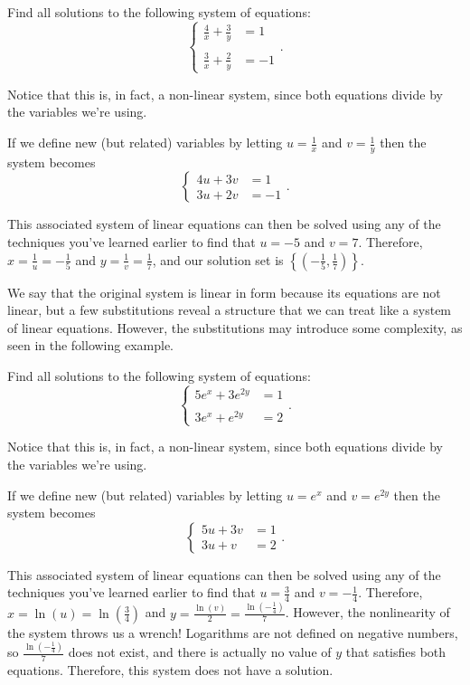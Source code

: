 \documentclass[nooutcomes]{ximera}
\begin{document}
\begin{example}
Find all solutions to the following system of equations:
$$
\begin{cases}
\frac{4}{x} + \frac{3}{y} & =  1 \\
& \\
\frac{3}{x} + \frac{2}{y} & =  -1
\end{cases}.
$$
\end{example}
\begin{explanation}
Notice that this is, in fact, a non-linear system, since both equations divide by the variables we're using.

If we define new (but related) variables by letting $u = \frac{1}{x}$ and $v = \frac{1}{y}$ then the system becomes 
$$
\begin{cases}
4u + 3v & =  1 \\
3u + 2v & =  -1
\end{cases}.
$$

This associated system of linear equations can then be solved using any of the techniques you've learned earlier to find that $u = -5$ and $v = 7$. Therefore, $x = \frac{1}{u} = -\frac{1}{5}$ and $y = \frac{1}{v} = \frac{1}{7}$, and our solution set is $\left\{\left(-\frac{1}{5}, \frac{1}{7}\right)\right\}$.
\end{explanation}

We say that the original system is linear in form because its equations are not linear, but a few substitutions reveal a structure that we can treat like a system of linear equations. However, the substitutions may introduce some complexity, as seen in the following example.

\begin{example}
Find all solutions to the following system of equations:
$$
\begin{cases}
5e^x + 3e^{2y} & =  1 \\
& \\
3e^x + e^{2y}& =  2
\end{cases}.
$$
\end{example}
\begin{explanation}
Notice that this is, in fact, a non-linear system, since both equations divide by the variables we're using.

If we define new (but related) variables by letting $u = e^x$ and $v = e^{2y}$ then the system becomes 
$$
\begin{cases}
5u + 3v & =  1 \\
3u + v & =  2
\end{cases}.
$$

This associated system of linear equations can then be solved using any of the techniques you've learned earlier to find that $u = \frac{3}{4}$ and $v = -\frac{1}{4}$. Therefore, $x = \ln(u) = \ln\left(\frac{3}{4}\right)$ and $y = \frac{\ln(v)}{2} = \frac{\ln\left(-\frac{1}{4}\right)}{7}$. However, the nonlinearity of the system throws us a wrench! Logarithms are not defined on negative numbers, so $\frac{\ln\left(-\frac{1}{4}\right)}{7}$ does not exist, and there is actually no value of $y$ that satisfies both equations. Therefore, this system does not have a solution.
\end{explanation}
\end{document}
